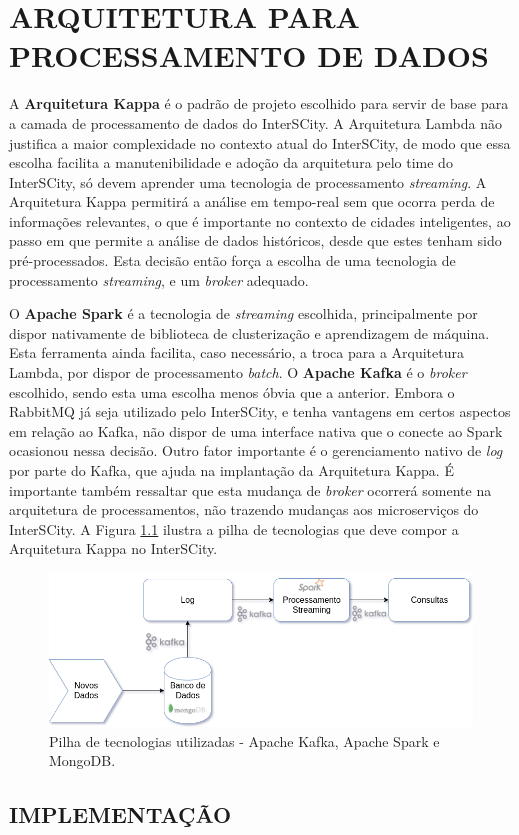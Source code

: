 \chapter[ARQUITETURA PARA PROCESSAMENTO DE DADOS]{ARQUITETURA PARA PROCESSAMENTO DE DADOS}
\label{chapter:architecture}

A \textbf{Arquitetura Kappa} é o padrão de projeto escolhido para servir de
base para a camada de processamento de dados do InterSCity. A Arquitetura
Lambda não justifica a maior complexidade no contexto atual do InterSCity, de
modo que essa escolha facilita a manutenibilidade e adoção da arquitetura pelo
time do InterSCity, só devem aprender uma tecnologia de processamento
\textit{streaming}. A Arquitetura Kappa permitirá a análise em tempo-real sem
que ocorra perda de informações relevantes, o que é importante no contexto de
cidades inteligentes, ao passo em que permite a análise de dados históricos,
desde que estes tenham sido pré-processados. Esta decisão então força a escolha
de uma tecnologia de processamento \textit{streaming}, e um \textit{broker}
adequado.

O \textbf{Apache Spark} é a tecnologia de \textit{streaming} escolhida,
principalmente por dispor nativamente de biblioteca de clusterização e
aprendizagem de máquina. Esta ferramenta ainda facilita, caso necessário, a
troca para a Arquitetura Lambda, por dispor de processamento \textit{batch}.
O \textbf{Apache Kafka} é o \textit{broker} escolhido, sendo esta uma escolha
menos óbvia que a anterior. Embora o RabbitMQ já seja utilizado pelo
InterSCity, e tenha vantagens em certos aspectos em relação ao Kafka, não
dispor de uma interface nativa que o conecte ao Spark ocasionou nessa decisão.
Outro fator importante é o gerenciamento nativo de \textit{log} por parte do
Kafka, que ajuda na implantação da Arquitetura Kappa. É importante também
ressaltar que esta mudança de \textit{broker} ocorrerá somente na arquitetura
de processamentos, não trazendo mudanças aos microserviços do InterSCity.
A Figura \ref{fig:stack} ilustra a pilha de tecnologias que deve compor a
Arquitetura Kappa no InterSCity.

\begin{figure}
  \centering
    \includegraphics[scale=0.5]{figuras/kappa_tools.png}
  \caption{Pilha de tecnologias utilizadas - Apache Kafka, Apache Spark e MongoDB.}
  \label{fig:stack}
\end{figure}


\section{IMPLEMENTAÇÃO}

